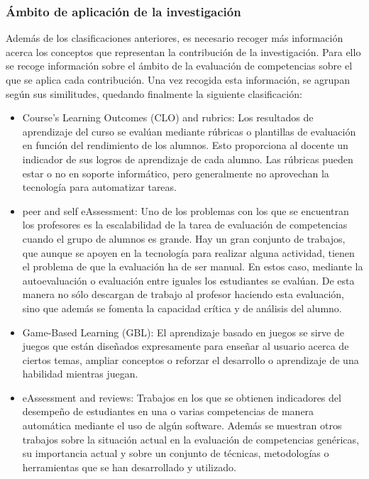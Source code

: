 \subsubsection{Ámbito de aplicación de la investigación}
Además de los clasificaciones anteriores, es necesario recoger más información acerca los conceptos que representan la contribución de la investigación. Para ello se recoge información sobre el ámbito de la evaluación de competencias sobre el que se aplica cada contribución. Una vez recogida esta información, se agrupan según sus similitudes, quedando finalmente la siguiente clasificación:
\begin{itemize}
\item Course’s Learning Outcomes (CLO) and rubrics: Los resultados de aprendizaje del curso se evalúan mediante rúbricas o plantillas de evaluación en función del rendimiento de los alumnos. Esto proporciona al docente un indicador de sus logros de aprendizaje de cada alumno. Las rúbricas pueden estar o no en soporte informático, pero generalmente no aprovechan la tecnología para automatizar tareas.
\item peer and self eAssessment: Uno de los problemas con los que se encuentran los profesores es la escalabilidad de la tarea de evaluación de competencias cuando el grupo de alumnos es grande. Hay un gran conjunto de trabajos, que aunque se apoyen en la tecnología para realizar alguna actividad, tienen el problema de que la evaluación ha de ser manual. En estos caso, mediante la autoevaluación o evaluación entre iguales los estudiantes se evalúan. De esta manera no sólo descargan de trabajo al profesor haciendo esta evaluación, sino que además se fomenta la capacidad crítica y de análisis del alumno.
\item Game-Based Learning (GBL): El aprendizaje basado en juegos se sirve de juegos que están diseñados expresamente para enseñar al usuario acerca de ciertos temas, ampliar conceptos o reforzar el desarrollo o aprendizaje de una habilidad mientras juegan.
\item eAssessment and reviews: Trabajos en los que se obtienen indicadores del desempeño de estudiantes en una o varias competencias de manera automática mediante el uso de algún software. Además se muestran otros trabajos sobre la situación actual en la evaluación de competencias genéricas, su importancia actual y sobre un conjunto de técnicas, metodologías o herramientas que se han desarrollado y utilizado.
\end{itemize}

